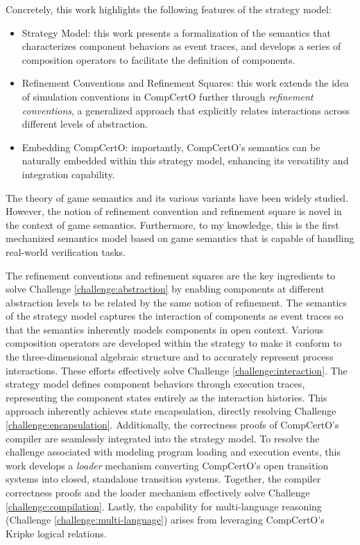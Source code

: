 Concretely,
this work highlights the following features
of the strategy model:
\begin{itemize}
  \item Strategy Model:
    this work presents a formalization of the semantics
    that characterizes component behaviors
    as event traces,
    and develops a series of
    composition operators
    to facilitate the definition of components.
  \item Refinement Conventions and Refinement Squares:
    this work extends the idea
    of simulation conventions in CompCertO
    further through \emph{refinement conventions},
    a generalized approach that
    explicitly relates interactions
    across different levels of abstraction.
  \item Embedding CompCertO:
    importantly, CompCertO's semantics
    can be naturally embedded
    within this strategy model,
    enhancing its versatility and integration capability.
\end{itemize}

The theory of game semantics
and its various variants
have been widely studied.
However,
the notion of refinement convention and refinement square
is novel in the context of game semantics.
Furthermore,
to my knowledge,
this is the first mechanized
semantics model based on game semantics
that is capable of
handling real-world verification tasks.

The refinement conventions
and refinement squares
are the key ingredients
to solve Challenge \ref{challenge:abstraction}
by enabling components at different abstraction levels
to be related by the same notion of refinement.
The semantics of the strategy model
captures the interaction of components
as event traces
so that the semantics inherently models
components in open context.
Various composition operators
are developed within the strategy
to make it conform to the three-dimensional algebraic structure
and to accurately represent process interactions.
These efforts effectively solve Challenge \ref{challenge:interaction}.
The strategy model defines component behaviors
through execution traces,
representing the component states entirely
as the interaction histories.
This approach inherently achieves state encapsulation,
directly resolving Challenge \ref{challenge:encapsulation}.
Additionally,
the correctness proofs of
CompCertO's compiler are seamlessly integrated into
the strategy model.
To resolve the challenge associated with
modeling program loading and execution events,
this work develops a \emph{loader} mechanism
converting CompCertO's open transition systems
into closed, standalone transition systems.
Together, the compiler correctness proofs
and the loader mechanism
effectively solve Challenge \ref{challenge:compilation}.
Lastly, the capability for multi-language reasoning (Challenge \ref{challenge:multi-language}) arises from
leveraging CompCertO's Kripke logical relations.


